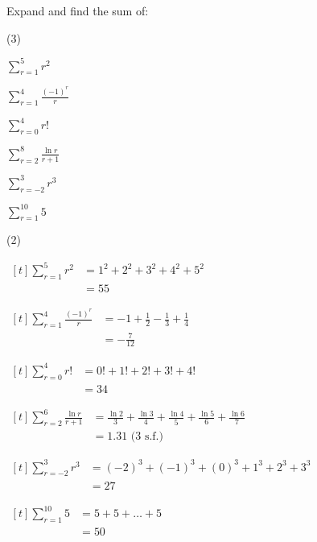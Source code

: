 \documentclass[11pt,a4paper]{book}
\begin{document}
\begin{example}

Expand and find the sum of:

\begin{tasks}[label=(\alph*),label-width=3.5ex](3)  

\task  ${\displaystyle \sum_{r=1}^{5}r^{2}}$ 

\task  ${\displaystyle \sum_{r=1}^{4}\frac{\left(-1\right)^{r}}{r}}$ 

\task  ${\displaystyle \sum_{r=0}^{4}r!}$ 

\task  ${\displaystyle \sum_{r=2}^{8}\frac{\ln r}{r+1}}$ 

\task  ${\displaystyle \sum_{r=-2}^{3}r^{3}}$ 

\task  ${\displaystyle \sum_{r=1}^{10}5}$ 

\end{tasks}

\Solution

\begin{tasks}[label=(\alph*),label-width=3.5ex](2)  

\task  
$
\begin{aligned}[t]
\sum_{r=1}^{5}r^{2} & =1^{2}+2^{2}+3^{2}+4^{2}+5^{2}\\
 & =55
\end{aligned}
$
 

\task  
$
\begin{aligned}[t]
\sum_{r=1}^{4}\frac{\left(-1\right)^{r}}{r} & =-1+\frac{1}{2}-\frac{1}{3}+\frac{1}{4}\\
 & =-\frac{7}{12}
\end{aligned}
$
 

\task  
$
\begin{aligned}[t]
\sum_{r=0}^{4}r! & =0!+1!+2!+3!+4!\\
 & =34
\end{aligned}
$ 

\task  
$
\begin{aligned}[t]
\sum_{r=2}^{6}\frac{\ln r}{r+1} & =\frac{\ln2}{3}+\frac{\ln3}{4}+\frac{\ln4}{5}+\frac{\ln5}{6}+\frac{\ln6}{7}\\
 & =1.31\text{ (3 s.f.)}
\end{aligned}
$

\task  
$
\begin{aligned}[t]
{\displaystyle \sum_{r=-2}^{3}r^{3}} & =\left(-2\right)^{3}+\left(-1\right)^{3}+\left(0\right)^{3}+1^{3}+2^{3}+3^{3}\\
 & =27
\end{aligned}
$

\task  
$
\begin{aligned}[t]
\sum_{r=1}^{10}5 & =5+5+\ldots+5\\
 & =50
\end{aligned}
$
 
\end{tasks}

\end{example}
\end{document}
